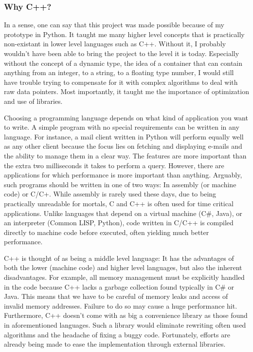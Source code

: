 \subsubsection{Why C++?}
In a sense, one can say that this project was made possible because of my prototype in Python. It taught me many higher level concepts that is practically non-existant in lower level languages such as C++. Without it, I probably wouldn't have been able to bring the project to the level it is today. Especially without the concept of a dynamic type, the idea of a container that can contain anything from an integer, to a string, to a floating type number, I would still have trouble trying to compensate for it with complex algorithms to deal with raw data pointers. Most importantly, it taught me the importance of optimization and use of libraries.

Choosing a programming language depends on what kind of application you want to write. A simple program with no special requirements can be written in any language. For instance, a mail client written in Python will perform equally well as any other client because the focus lies on fetching and displaying e-mails and the ability to manage them in a clear way. The features are more important than the extra two milliseconds it takes to perform a query. However, there are applications for which performance is more important than anything. Arguably, such programs should be written in one of two ways: In assembly (or machine code) or C/C+. While assembly is rarely used these days, due to being practically unreadable for mortals, C and C++ is often used for time critical applications. Unlike languages that depend on a virtual machine (C\#, Java), or an interpreter (Common LISP, Python), code written in C/C++ is compiled directly to machine code before executed, often yielding much better performance.

C++ is thought of as being a middle level language: It has the advantages of both the lower (machine code) and higher level languages, but also the inherent disadvantages. For example, all memory management must be explicitly handled in the code because C++ lacks a garbage collection found typically in C\# or Java. This means that we have to be careful of memory leaks and access of invalid memory addresses. Failure to do so may cause a huge performance hit. Furthermore, C++ doesn't come with as big a convenience library as those found in aforementioned languages. Such a library would eliminate rewriting often used algorithms and the headache of fixing a buggy code. Fortunately, efforts are already being made to ease the implementation through external libraries.

